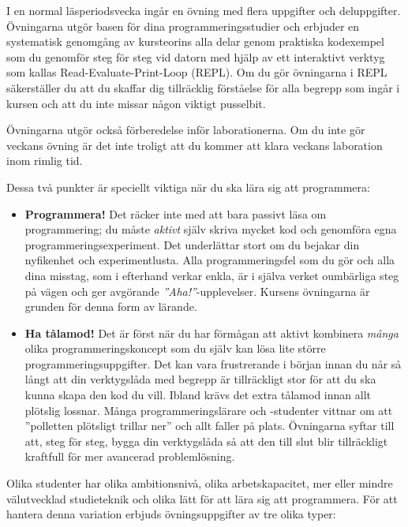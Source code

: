 I en normal läsperiodsvecka ingår en övning med flera uppgifter och deluppgifter.
Övningarna utgör basen för dina programmeringsstudier och erbjuder en systematisk genomgång av kursteorins alla delar genom praktiska kodexempel som du genomför steg för steg vid datorn med hjälp av ett interaktivt verktyg som kallas Read-Evaluate-Print-Loop (REPL). Om du gör övningarna i REPL säkerställer du att du skaffar dig tillräcklig förståelse för alla begrepp som ingår i kursen och att du inte missar någon viktigt pusselbit.

Övningarna utgör också förberedelse inför laborationerna. Om du inte gör veckans övning är det inte troligt att du kommer att klara veckans laboration inom rimlig tid.

Dessa två punkter är speciellt viktiga när du ska lära sig att programmera:
\begin{itemize}
\item \textbf{Programmera!} Det räcker inte med att bara passivt läsa om programmering; du måste \emph{aktivt} själv skriva mycket kod och genomföra egna programmeringsexperiment. Det underlättar stort om du bejakar din nyfikenhet och experimentlusta. Alla programmeringsfel som du gör och alla dina misstag, som i efterhand verkar enkla, är i själva verket oumbärliga steg på vägen och ger avgörande \emph{''Aha!''}-upplevelser. Kursens övningarna är grunden för denna form av lärande.

\item \textbf{Ha tålamod!} Det är först när du har förmågan att aktivt kombinera \emph{många} olika programmeringskoncept som du själv kan lösa lite större programmeringsuppgifter. Det kan vara frustrerande i början innan du når så långt att din verktygslåda med begrepp är tillräckligt stor för att du ska kunna skapa den kod du vill. Ibland krävs det extra tålamod innan allt plötslig lossnar. Många programmeringslärare och -studenter vittnar om att ''polletten plötsligt trillar ner'' och allt faller på plats. Övningarna syftar till att, steg för steg, bygga din verktygslåda så att den till slut blir tillräckligt kraftfull för mer avancerad problemlösning.
\end{itemize}

Olika studenter har olika ambitionsnivå, olika arbetskapacitet, mer eller mindre välutvecklad studieteknik och olika lätt för att lära sig att programmera. För att hantera denna variation erbjuds övningsuppgifter av tre olika typer:

